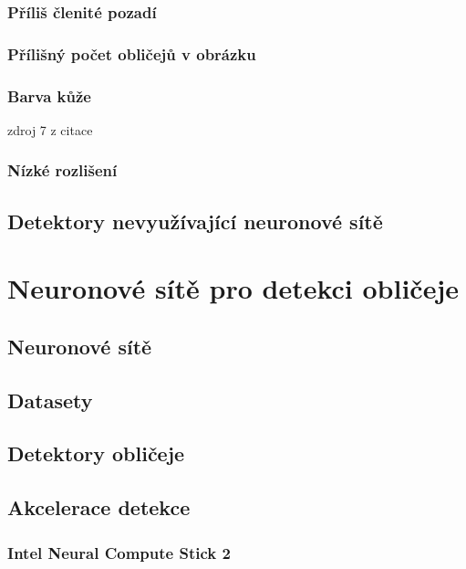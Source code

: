 \subsection*{Příliš členité pozadí} 

\subsection*{Přílišný počet obličejů v obrázku}

\subsection*{Barva kůže}
zdroj 7 z citace \cite{feature-based-fd-review}

\subsection*{Nízké rozlišení}

\section{Detektory nevyužívající neuronové sítě}
\label{sekce:detektory_bez_neuronovych_siti}



\chapter{Neuronové sítě pro detekci obličeje}

\section{Neuronové sítě}

\section{Datasety}

\section{Detektory obličeje}
\label{sekce:detektory_s_neuronovymi_sitemi}

\section{Akcelerace detekce}

\subsection*{Intel Neural Compute Stick 2}





